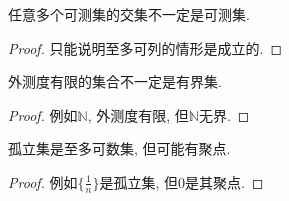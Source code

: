 \documentclass[theorem=false,mathfont=none,openany,sub3section]{easybook}
\begin{document}
\begin{example}
  任意多个可测集的交集不一定是可测集.
\end{example}

\begin{proof}
  只能说明至多可列的情形是成立的.\par
\end{proof}

\begin{example}
  外测度有限的集合不一定是有界集.\par
\end{example}

\begin{proof}
  例如$\mathbb{N}$, 外测度有限, 但$\mathbb{N}$无界.\par
\end{proof}

\begin{example}
  孤立集是至多可数集, 但可能有聚点.\par
\end{example}

\begin{proof}
  例如$\{\frac{1}{n}\}$是孤立集, 但$0$是其聚点.\par
\end{proof}

\backmatter
\end{document}
